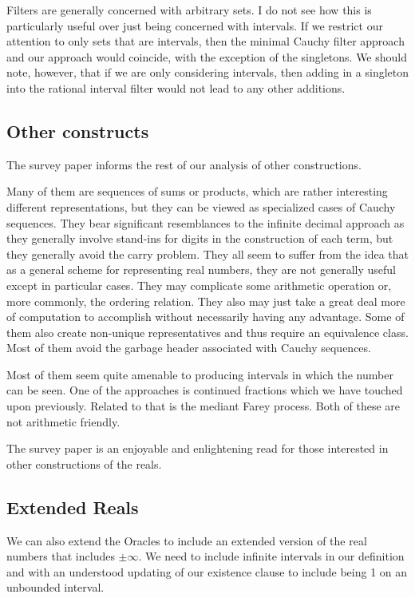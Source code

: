 \documentclass[12pt]{article}
\theoremstyle{remark}
\begin{document}
Filters are generally concerned with arbitrary sets. I do not see how this is particularly useful over just being concerned with intervals. If we restrict our attention to only sets that are intervals, then the minimal Cauchy filter approach and our approach would coincide, with the exception of the singletons. We should note, however, that if we are only considering intervals, then adding in a singleton into the rational interval filter would not lead to any other additions.

\subsection{Other constructs}

The survey paper \cite{ittay-2015} informs the rest of our analysis of other constructions. 

Many of them are sequences of sums or products, which are rather interesting different representations, but they can be viewed as specialized cases of Cauchy sequences. They bear significant resemblances to the infinite decimal approach as they generally involve stand-ins for digits in the construction of each term, but they generally avoid the carry problem. They all seem to suffer from the idea that as a general scheme for representing real numbers, they are not generally useful except in particular cases. They may complicate some arithmetic operation or, more commonly, the ordering relation. They also may just take a great deal more of computation to accomplish without necessarily having any advantage. Some of them also create non-unique representatives and thus require an equivalence class. Most of them avoid the garbage header associated with Cauchy sequences. 

Most of them seem quite amenable to producing intervals in which the number can be seen. One of the approaches is continued fractions which we have touched upon previously. Related to that is the mediant Farey process. Both of these are not arithmetic friendly. 

The survey paper is an enjoyable and enlightening read for those interested in other constructions of the reals. 

\subsection{Extended Reals}

We can also extend the Oracles to include an extended version of the real numbers that includes $\pm \infty$. We need to include infinite intervals in our definition and with an understood updating of our existence clause to include being 1 on an unbounded interval.
\end{document}

